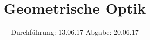 

\subject{V408}
\title{Geometrische Optik}
\date{
  Durchführung: 13.06.17
  \hspace{3em}
  Abgabe: 20.06.17
}



\maketitle
\thispagestyle{empty}
\tableofcontents
\newpage
\setcounter{page}{1}





\printbibliography


